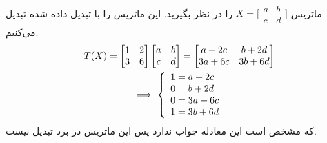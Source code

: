\\
ماتریس
$X = \bigl[ \begin{smallmatrix}a & b\\ c & d\end{smallmatrix}\bigr]$
را در نظر بگیرید. این ماتریس را با تبدیل داده شده تبدیل می‌کنیم:
\begin{gather*}
    T(X) = \begin{bmatrix}
        1 & 2\\
        3 & 6
    \end{bmatrix}
    \begin{bmatrix}
        a & b\\
        c & d
    \end{bmatrix}
    =
    \begin{bmatrix}
        a + 2c & b + 2d\\
        3a + 6c & 3b + 6d
    \end{bmatrix}\\
    \implies \left\{\begin{array}{r@{\mskip\thickmuskip}l}
		1 &= a + 2c\\
		0 &= b + 2d\\
		0 &= 3a + 6c\\
		1 &= 3b + 6d
    \end{array}\right.
\end{gather*}
که مشخص است این معادله جواب ندارد پس این ماتریس در برد تبدیل نیست.




